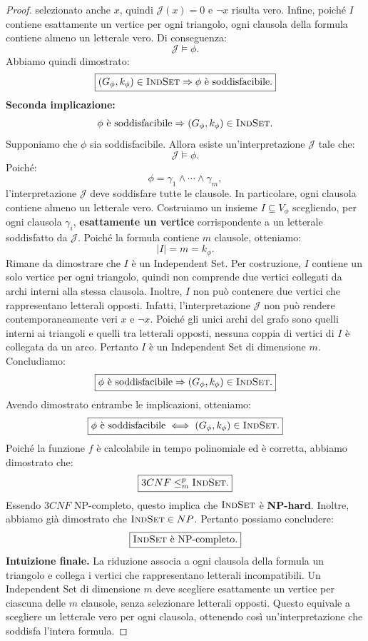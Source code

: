 \begin{proof}
selezionato anche $x$, quindi
$\mathcal J(x)=0$ e $\neg x$ risulta vero.
Infine, poiché $I$ contiene esattamente
un vertice per ogni triangolo,
ogni clausola della formula contiene
almeno un letterale vero.
Di conseguenza:
\[
\mathcal J\models\phi.
\]
Abbiamo quindi dimostrato:
\[
\boxed{
(G_\phi,k_\phi)\in \textsc{IndSet}
\Rightarrow
\phi\text{ è soddisfacibile}.
}
\]
\medskip
\noindent
\textbf{Seconda implicazione:}
\[
\phi\text{ è soddisfacibile}
\Rightarrow
(G_\phi,k_\phi)\in \textsc{IndSet}.
\]
Supponiamo che $\phi$ sia soddisfacibile.
Allora esiste un'interpretazione
$\mathcal J$ tale che:
\[
\mathcal J\models\phi.
\]
Poiché:
\[
\phi=\gamma_1\land\cdots\land\gamma_m,
\]
l'interpretazione $\mathcal J$
deve soddisfare tutte le clausole.
In particolare, ogni clausola
contiene almeno un letterale vero.
Costruiamo un insieme $I\subseteq V_\phi$
scegliendo, per ogni clausola $\gamma_i$,
\textbf{esattamente un vertice}
corrispondente a un letterale
soddisfatto da $\mathcal J$.
Poiché la formula contiene $m$
clausole, otteniamo:
\[
\boxed{|I|=m=k_\phi.}
\]
Rimane da dimostrare che $I$
è un Independent Set.
Per costruzione, $I$ contiene
un solo vertice per ogni triangolo,
quindi non comprende due vertici
collegati da archi interni
alla stessa clausola.
Inoltre, $I$ non può contenere
due vertici che rappresentano
letterali opposti.
Infatti, l'interpretazione
$\mathcal J$ non può rendere
contemporaneamente veri
$x$ e $\neg x$.
Poiché gli unici archi del grafo
sono quelli interni ai triangoli
e quelli tra letterali opposti,
nessuna coppia di vertici di $I$
è collegata da un arco.
Pertanto $I$ è un Independent Set
di dimensione $m$.
Concludiamo:
\[
\boxed{
\phi\text{ è soddisfacibile}
\Rightarrow
(G_\phi,k_\phi)\in \textsc{IndSet}.
}
\]
\medskip
Avendo dimostrato entrambe
le implicazioni, otteniamo:
\[
\boxed{
\phi\text{ è soddisfacibile}
\iff
(G_\phi,k_\phi)\in \textsc{IndSet}.
}
\]
Poiché la funzione $f$ è calcolabile
in tempo polinomiale ed è corretta,
abbiamo dimostrato che:
\[
\boxed{3CNF\leq_m^p \textsc{IndSet}.}
\]
Essendo $3CNF$ NP-completo,
questo implica che $\textsc{IndSet}$
è \textbf{NP-hard}.
Inoltre, abbiamo già dimostrato
che $\textsc{IndSet}\in NP$.
Pertanto possiamo concludere:
\[
\boxed{
\textsc{IndSet}\text{ è NP-completo}.
}
\]
\smallskip
\noindent
\textbf{Intuizione finale.}
La riduzione associa a ogni clausola
della formula un triangolo e collega
i vertici che rappresentano
letterali incompatibili.
Un Independent Set di dimensione $m$
deve scegliere esattamente un vertice
per ciascuna delle $m$ clausole,
senza selezionare letterali opposti.
Questo equivale a scegliere
un letterale vero per ogni clausola,
ottenendo così un'interpretazione
che soddisfa l'intera formula.
\end{proof}




